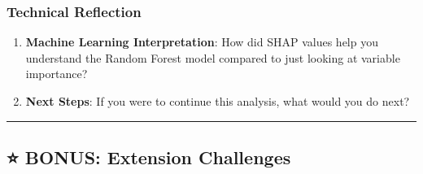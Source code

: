 \documentclass[
  letterpaper,
  DIV=11,
  numbers=noendperiod]{scrartcl}
\begin{document}
\begin{tcolorbox}
\subsubsection{Technical Reflection}\label{technical-reflection}

\begin{enumerate}
\def\labelenumi{\arabic{enumi}.}
\setcounter{enumi}{5}
\item
  \textbf{Machine Learning Interpretation}: How did SHAP values help you
  understand the Random Forest model compared to just looking at
  variable importance?
\item
  \textbf{Next Steps}: If you were to continue this analysis, what would
  you do next?
\end{enumerate}

\end{tcolorbox}

\begin{center}\rule{0.5\linewidth}{0.5pt}\end{center}

\subsection{⭐ BONUS: Extension
Challenges}\label{bonus-extension-challenges}
\end{document}
